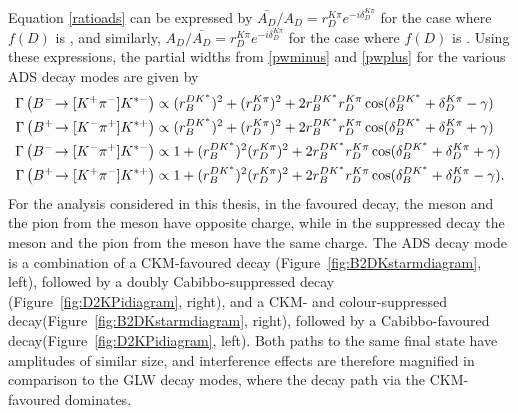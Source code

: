 Equation \ref{ratioads} can be expressed by $\bar{A_{D}}/A_{D} = r_D^{K\pi}e^{-i\delta_D^{K\pi}}$ for the case where $f(D)$ is \Km\pip, and similarly, $A_{D}/\bar{A_{D}} = r_D^{K\pi}e^{-i\delta_D^{K\pi}}$ for the case where $f(D)$ is \Kp\pim. Using these expressions, the partial widths from \eqn\ref{pwminus} and \ref{pwplus} for the various \decay{\Bpm}{\D\Kstarpm} ADS decay modes are given by
\begin{align}
\Gamma\left({{{B}^-}}\!\rightarrow [{{K}^+}{{\pi}^-}]{\ensuremath{{K}^{*-}}}\right) &\propto (r_B^{DK^*})^2 + (r_D^{K\pi})^2 + 2r_B^{DK^*}r_D^{K\pi}\cos(\delta_B^{DK^*} + \delta_D^{K\pi} - \gamma) \label{adsBdecaym} \\
\Gamma\left({{{B}^+}}\!\rightarrow [{{K}^-}{{\pi}^+}]{\ensuremath{{K}^{*+}}}\right) &\propto (r_B^{DK^*})^2 + (r_D^{K\pi})^2 + 2r_B^{DK^*}r_D^{K\pi}\cos(\delta_B^{DK^*} + \delta_D^{K\pi} + \gamma) \label{adsBdecayp} \\
\Gamma\left({{{B}^-}}\!\rightarrow [{{K}^-}{{\pi}^+}]{\ensuremath{{K}^{*-}}}\right) &\propto 1 + (r_B^{DK^*})^2(r_D^{K\pi})^2 + 2r_B^{DK^*}r_D^{K\pi}\cos(\delta_B^{DK^*} + \delta_D^{K\pi} + \gamma) \label{favBdecaym} \\
\Gamma\left({{{B}^+}}\!\rightarrow [{{K}^+}{{\pi}^-}]{\ensuremath{{K}^{*+}}}\right) &\propto 1 + (r_B^{DK^*})^2(r_D^{K\pi})^2 + 2r_B^{DK^*}r_D^{K\pi}\cos(\delta_B^{DK^*} + \delta_D^{K\pi} - \gamma) \text {.} \label{favBdecayp} 
\end{align}
For the analysis considered in this thesis, in the favoured decay, the \Kstarm meson and the pion from the \D meson have opposite charge, while in the suppressed decay the \Kstarm meson and the pion from the \D meson have the same charge. The ADS decay mode is a combination of a CKM-favoured \decay{\Bm}{\Dz\Kstarm} decay (Figure~\ref{fig:B2DKstarmdiagram}, left), followed by a doubly Cabibbo-suppressed \decay{\Dz}{\Kp\pim} decay (Figure~\ref{fig:D2KPidiagram}, right), and a CKM- and colour-suppressed \decay{\Bm}{\Dzb\Kstarm} decay(Figure~\ref{fig:B2DKstarmdiagram}, right), followed by a Cabibbo-favoured \decay{\Dzb}{\Kp\pim} decay(Figure~\ref{fig:D2KPidiagram}, left). Both paths to the same final state have amplitudes of similar size, and interference effects are therefore magnified in comparison to the GLW decay modes, where the decay path via the CKM-favoured \decay{\Bm}{\Dz\Kstarm} dominates.

